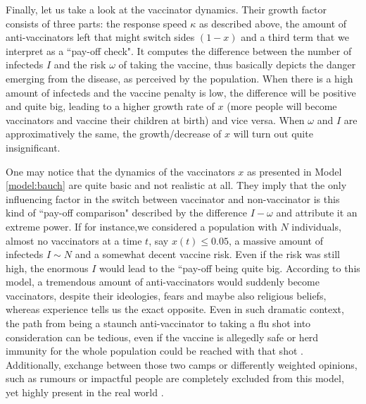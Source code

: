 \documentclass[12pt,a4paper,twoside]{article}
\begin{document}
Finally, let us take a look at the vaccinator dynamics. Their growth factor consists of three parts: the response speed $\kappa$ as described above, the amount of anti-vaccinators left that might switch sides $(1-x)$ and a third term that we interpret as a ``pay-off check". It computes the difference between the number of infecteds $I$ and the risk $\omega$ of taking the vaccine, thus basically depicts the danger emerging from the disease, as perceived by the population. When there is a high amount of infecteds and the vaccine penalty is low, the difference will be positive and quite big, leading to a higher growth rate of $x$ (more people will become vaccinators and vaccine their children at birth) and vice versa. When $\omega$ and $I$ are approximatively the same, the growth/decrease of $x$ will turn out quite insignificant.

One may notice that the dynamics of the vaccinators $x$ as presented in Model \ref{model:bauch} are quite basic and not realistic at all. They imply that the only influencing factor in the switch between vaccinator and non-vaccinator is this kind of ``pay-off comparison" described by the difference $I - \omega$ and attribute it an extreme power. If for instance,we considered a population with $N$ individuals, almost no vaccinators at a time $t$, say $x(t) \leq 0.05$, a massive amount of infecteds $I \sim N$ and a somewhat decent vaccine risk. Even if the risk was still high, the enormous $I$ would lead to the ``pay-off being quite big. According to this model, a tremendous amount of anti-vaccinators would suddenly become vaccinators, despite their ideologies, fears and maybe also religious beliefs, whereas experience tells us the exact opposite. Even in such dramatic context, the path from being a staunch anti-vaccinator to taking a flu shot into consideration can be tedious, even if the vaccine is allegedly safe or herd immunity for the whole population could be reached with that shot \cite{Meyer2004, Bednarz2020, Health2019}. Additionally, exchange between those two camps or differently weighted opinions, such as rumours or impactful people are completely excluded from this model, yet highly present in the real world \cite{Pincock2004}.
\end{document}
